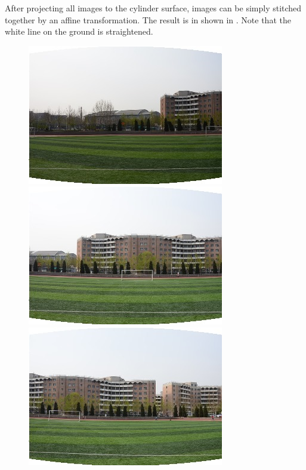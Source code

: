 After projecting all images to the cylinder surface, images can be
simply stitched together by an affine transformation.
The result is in shown in . Note that the white line on
the ground is straightened.
\begin{figure}[H]
  \centering
  \begin{minipage}[b]{0.24\linewidth}
    \includegraphics[scale=0.3]{res/1.png}
  \end{minipage}
  \begin{minipage}[b]{0.24\linewidth}
    \includegraphics[scale=0.3]{res/2.png}
  \end{minipage}
  \begin{minipage}[b]{0.24\linewidth}
    \includegraphics[scale=0.3]{res/3.png}
  \end{minipage}

\end{figure}
